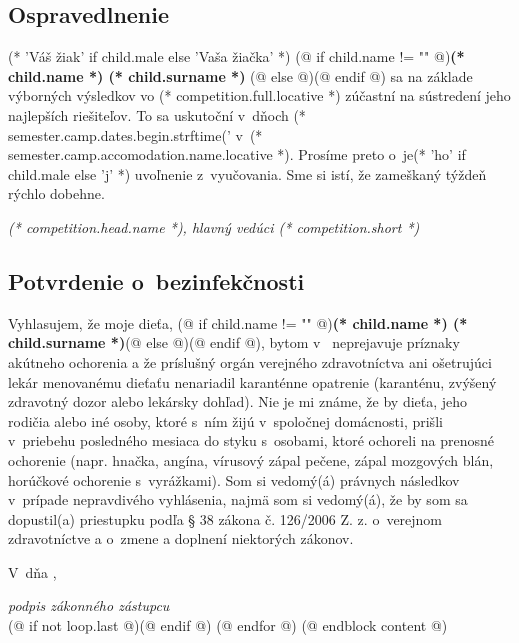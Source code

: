             \cutHere

            \subsection{Ospravedlnenie}
                (* 'Váš žiak' if child.male else 'Vaša žiačka' *)
                (@ if child.name != "" @)\textbf{(* child.name *) (* child.surname *)} (@ else @)\makebox[30mm]{\dotfill}(@ endif @)
                sa na základe výborných výsledkov vo (* competition.full.locative *)
                zúčastní na sústredení jeho najlepších riešiteľov. To sa uskutoční v~dňoch
                (* semester.camp.dates.begin.strftime('%
                v~(* semester.camp.accomodation.name.locative *). Prosíme preto o~je(* 'ho' if child.male else 'j' *) uvoľnenie z~vyučovania.
                Sme si istí, že zameškaný týždeň rýchlo dobehne.
                \vspace{5mm}

                \hfill \dotfill

                \vspace*{-8pt}
                \hfill \textit{(* competition.head.name *), hlavný vedúci (* competition.short *)}

            \cutHere

            \subsection{Potvrdenie o~bezinfekčnosti}
                Vyhlasujem, že moje dieťa,
                (@ if child.name != "" @)\textbf{(* child.name *) (* child.surname *)}(@ else @)\makebox[30mm]{\dotfill}(@ endif @),
                bytom v~\makebox[30mm]{\dotfill} neprejavuje príznaky akútneho ochorenia a že
                príslušný orgán verejného zdravotníctva ani ošetrujúci lekár menovanému dieťaťu nenariadil
                karanténne opatrenie (karanténu, zvýšený zdravotný dozor alebo lekársky dohľad). Nie je mi známe, že
                by dieťa, jeho rodičia alebo iné osoby, ktoré s~ním žijú v~spoločnej domácnosti, prišli v~priebehu
                posledného mesiaca do styku s~osobami, ktoré ochoreli na prenosné ochorenie (napr. hnačka, angína,
                vírusový zápal pečene, zápal mozgových blán, horúčkové ochorenie s~vyrážkami). Som si
                vedomý(á) právnych následkov v~prípade nepravdivého vyhlásenia, najmä som si vedomý(á), že by som sa
                dopustil(a) priestupku podľa § 38 zákona č. 126/2006 Z. z. o~verejnom zdravotníctve a o~zmene a
                doplnení niektorých zákonov.
                \vspace{5mm}

                V~\dotfill dňa \dotfill, \hfill \dotfill

                \vspace*{-8pt}
                \hfill \textit{podpis zákonného zástupcu} \\[5mm]

            (@ if not loop.last @)\newpage(@ endif @)
    (@ endfor @)
(@ endblock content @)
